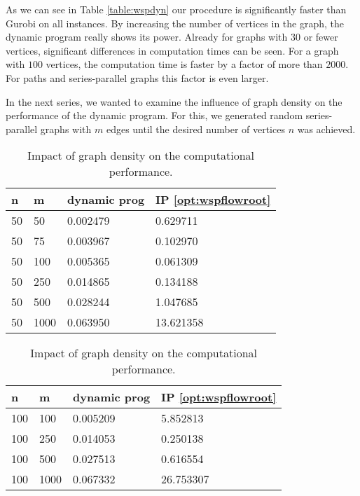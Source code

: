 As we can see in Table \ref{table:wspdyn} our procedure is significantly faster than Gurobi on all instances. By increasing the number of vertices in the graph, the dynamic program really shows its power. Already for graphs with $30$ or fewer vertices, significant differences in computation times can be seen. For a graph with $100$ vertices, the computation time is faster by a factor of more than $2000$. For paths and series-parallel graphs this factor is even larger.\medskip

In the next series, we wanted to examine the influence of graph density on the performance of the dynamic program. For this, we generated random series-parallel graphs with $m$ edges until the desired number of vertices $n$ was achieved.

\begin{table}[H]
	\centering
	\small
	\begin{minipage}{.5\linewidth}
		\centering
		\begin{tabular}{|l|l|l|l|}
			\hline
			n&m&dynamic prog&IP \ref{opt:wspflowroot}\\ \hline
			50&50&0.002479&0.629711\\ \hline
			50&75&0.003967&0.102970\\ \hline
			50&100&0.005365&0.061309\\ \hline
			50&250&0.014865&0.134188\\ \hline
			50&500&0.028244&1.047685\\ \hline
			50&1000&0.063950&13.621358\\ \hline
		\end{tabular}
	\end{minipage}%
	\begin{minipage}{.5\linewidth}
		\centering
		\begin{tabular}{|l|l|l|l|}
			\hline
			n&m&dynamic prog&IP \ref{opt:wspflowroot}\\ \hline
			100&100&0.005209&5.852813\\ \hline
			100&250&0.014053&0.250138\\ \hline
			100&500&0.027513&0.616554\\ \hline
			100&1000&0.067332&26.753307\\ \hline
		\end{tabular}
	\end{minipage}%
	\caption{Impact of graph density on the computational performance.}
	\label{table:density}
\end{table}

